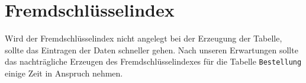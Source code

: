 \section*{Fremdschlüsselindex}
Wird der Fremdschlüsselindex nicht angelegt bei der Erzeugung der Tabelle, sollte das Eintragen der Daten schneller gehen. Nach unseren Erwartungen sollte das nachträgliche Erzeugen des Fremdschlüsselindexes für die Tabelle \texttt{Bestellung} einige Zeit in Anspruch nehmen.